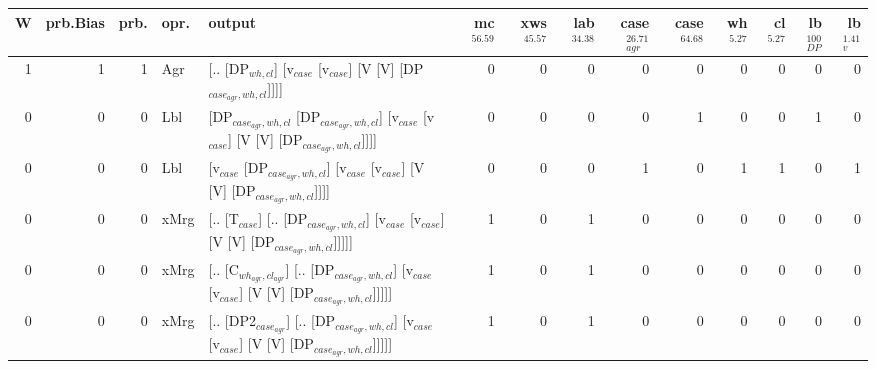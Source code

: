 \begin{tabularx}{\linewidth}{rrrlXrrrrrrrrr}
\hline
   W &   prb.Bias &   prb. & opr.   & output                                                                                                                    &   mc$^{56.59}$ &   xws$^{45.57}$ &   lab$^{34.38}$ &   case$_{agr}^{26.71}$ &   case$^{64.68}$ &   wh$^{5.27}$ &   cl$^{5.27}$ &   lb$_{DP}^{100}$ &   lb$_{v}^{1.41}$ \\
\hline
   1 &       1 &   1 & Agr  & [.. [DP$_{wh,cl}$] [v$_{case}$ [v$_{case}$] [V [V] [DP$_{case_{agr},wh,cl}$]]]]                                                             &            0 &             0 &             0 &                  0 &              0 &           0 &           0 &                0 &             0 \\
   0 &       0 &   0 & Lbl  & [DP$_{case_{agr},wh,cl}$ [DP$_{case_{agr},wh,cl}$] [v$_{case}$ [v$_{case}$] [V [V] [DP$_{case_{agr},wh,cl}$]]]]                                     &            0 &             0 &             0 &                  0 &              1 &           0 &           0 &                1 &             0 \\
   0 &       0 &   0 & Lbl  & [v$_{case}$ [DP$_{case_{agr},wh,cl}$] [v$_{case}$ [v$_{case}$] [V [V] [DP$_{case_{agr},wh,cl}$]]]]                                                &            0 &             0 &             0 &                  1 &              0 &           1 &           1 &                0 &             1 \\
   0 &       0 &   0 & xMrg & [.. [T$_{case}$] [.. [DP$_{case_{agr},wh,cl}$] [v$_{case}$ [v$_{case}$] [V [V] [DP$_{case_{agr},wh,cl}$]]]]]                                      &            1 &             0 &             1 &                  0 &              0 &           0 &           0 &                0 &             0 \\
   0 &       0 &   0 & xMrg & [.. [C$_{wh_{agr},cl_{agr}}$] [.. [DP$_{case_{agr},wh,cl}$] [v$_{case}$ [v$_{case}$] [V [V] [DP$_{case_{agr},wh,cl}$]]]]]                             &            1 &             0 &             1 &                  0 &              0 &           0 &           0 &                0 &             0 \\
   0 &       0 &   0 & xMrg & [.. [DP2$_{case_{agr}}$] [.. [DP$_{case_{agr},wh,cl}$] [v$_{case}$ [v$_{case}$] [V [V] [DP$_{case_{agr},wh,cl}$]]]]]                                &            1 &             0 &             1 &                  0 &              0 &           0 &           0 &                0 &             0 \\

\end{tabularx}
